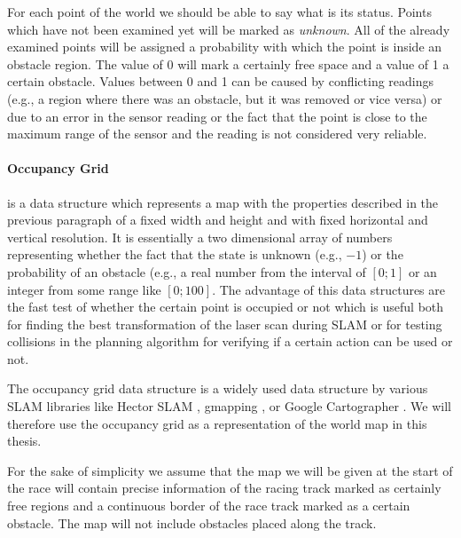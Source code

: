 
\begin{subparagraph}
For each point of the world we should be able to say what is its status. Points which have not been examined yet will be marked as \textit{unknown}. All of the already examined points will be assigned a probability with which the point is inside an obstacle region. The value of 0 will mark a certainly free space and a value of 1 a certain obstacle. Values between 0 and 1 can be caused by conflicting readings (e.g., a region where there was an obstacle, but it was removed or vice versa) or due to an error in the sensor reading or the fact that the point is close to the maximum range of the sensor and the reading is not considered very reliable.
\end{subparagraph}

\paragraph{Occupancy Grid} is a data structure which represents a map with the properties described in the previous paragraph of a fixed width and height and with fixed horizontal and vertical resolution. It is essentially a two dimensional array of numbers representing whether the fact that the state is unknown (e.g., $-1$) or the probability of an obstacle (e.g., a real number from the interval of $[0; 1]$ or an integer from some range like $[0; 100]$. The advantage of this data structures are the fast test of whether the certain point is occupied or not which is useful both for finding the best transformation of the laser scan during SLAM or for testing collisions in the planning algorithm for verifying if a certain action can be used or not.


\begin{subparagraph}
The occupancy grid data structure is a widely used data structure by various SLAM libraries like Hector SLAM \cite{hector}, gmapping \cite{gmapping}, or Google Cartographer \cite{google_cartographer}. We will therefore use the occupancy grid as a representation of the world map in this thesis.
\end{subparagraph}

For the sake of simplicity we assume that the map we will be given at the start of the race will contain precise information of the racing track marked as certainly free regions and a continuous border of the race track marked as a certain obstacle. The map will not include obstacles placed along the track.

